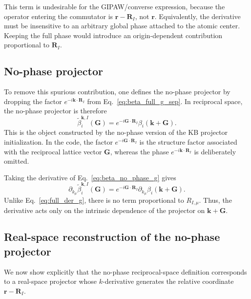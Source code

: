 \documentclass[11pt]{article}
\begin{document}
This term is undesirable for the GIPAW/converse expression, because the
operator entering the commutator is $\mathbf r-\mathbf R_I$, not
$\mathbf r$. Equivalently, the derivative must be insensitive to an
arbitrary global phase attached to the atomic center. Keeping the
full phase would introduce an origin-dependent contribution proportional
to $\mathbf R_I$.

\subsection{No-phase projector}

To remove this spurious contribution, one defines the no-phase projector
by dropping the factor $e^{-i\mathbf k\cdot\mathbf R_I}$ from
Eq.~\eqref{eq:beta_full_g_sep}. In reciprocal space, the no-phase
projector is therefore
\begin{equation}
\widetilde{\beta}_{i}^{\mathbf k,I}(\mathbf G)
=
e^{-i\mathbf G\cdot\mathbf R_I}
\beta_i(\mathbf k+\mathbf G).
\label{eq:beta_no_phase_g}
\end{equation}
This is the object constructed by the no-phase version of the KB
projector initialization. In the code, the factor
$e^{-i\mathbf G\cdot\mathbf R_I}$ is the structure factor associated
with the reciprocal lattice vector $\mathbf G$, whereas the phase
$e^{-i\mathbf k\cdot\mathbf R_I}$ is deliberately omitted.

Taking the derivative of Eq.~\eqref{eq:beta_no_phase_g} gives
\begin{equation}
\partial_{k_\mu}
\widetilde{\beta}_{i}^{\mathbf k,I}(\mathbf G)
=
e^{-i\mathbf G\cdot\mathbf R_I}
\partial_{k_\mu}\beta_i(\mathbf k+\mathbf G).
\label{eq:no_phase_der_g}
\end{equation}
Unlike Eq.~\eqref{eq:full_der_g}, there is no term proportional to
$R_{I,\mu}$. Thus, the derivative acts only on the intrinsic dependence
of the projector on $\mathbf k+\mathbf G$.

\subsection{Real-space reconstruction of the no-phase projector}

We now show explicitly that the no-phase reciprocal-space definition
corresponds to a real-space projector whose $k$-derivative generates
the relative coordinate $\mathbf r-\mathbf R_I$.
\end{document}
